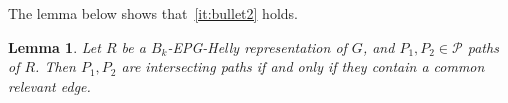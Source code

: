 \documentclass[9pt]{entcs}
\newtheorem{lema}{Lemma}[section]
\newtheorem{prove}{Proof}[section]
\begin{document}


The lemma below shows that~\ref{it:bullet2} holds.

\begin{lema}\label{lem:relevantEdges}
Let $R$ be a $B_k$-EPG-Helly representation of $G$, and $P_1, P_2 \in \mathcal{P}$ paths of $R$. Then $P_1, P_2$ are intersecting paths if and only if they contain a common relevant edge.
\end{lema}





\end{document}
